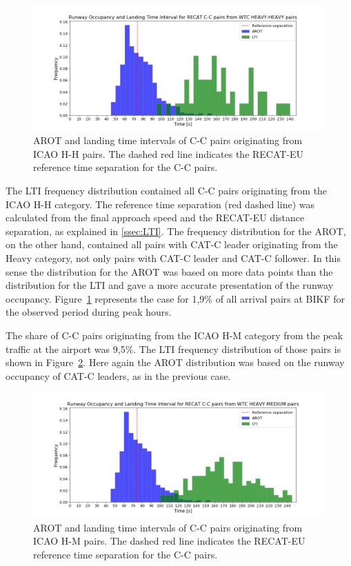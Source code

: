 \begin{figure}[h]
    \centering
    \includegraphics[width=1\textwidth]{graphics/fig_CC_from_HH_pairs_time_sep.png}
    \caption[AROT and LTI of C-C pairs originating from ICAO H-H pairs]{AROT and landing time intervals of C-C pairs originating from ICAO H-H pairs. The dashed red line indicates the RECAT-EU reference time separation for the C-C pairs.}
    \label{fig:CC_from_HH_pairs_time_sep}
\end{figure}

The LTI frequency distribution contained all C-C pairs originating from the ICAO H-H category. The reference time separation (red dashed line) was calculated from the final approach speed and the RECAT-EU distance separation, as explained in \ref{ssec:LTI}. The frequency distribution for the AROT, on the other hand, contained all pairs with CAT-C leader originating from the Heavy category, not only pairs with CAT-C leader and CAT-C follower. In this sense the distribution for the AROT was based on more data points than the distribution for the LTI and gave a more accurate presentation of the runway occupancy. Figure~\ref{fig:CC_from_HH_pairs_time_sep} represents the case for 1,9\% of all arrival pairs at BIKF for the observed period during peak hours.

The share of C-C pairs originating from the ICAO H-M category from the peak traffic at the airport was 9,5\%.  The LTI frequency distribution of those pairs is shown in Figure~\ref{fig:CC_from_HM_pairs_time_sep}. Here again the AROT distribution was based on the runway occupancy of CAT-C leaders, as in the previous case. 
 
\begin{figure}[h]
    \centering
    \includegraphics[width=1\textwidth]{graphics/fig_CC_from_HM_pairs_time_sep.png}
    \caption[AROT and LTI of C-C pairs originating from ICAO H-M pairs]{AROT and landing time intervals of C-C pairs originating from ICAO H-M pairs. The dashed red line indicates the RECAT-EU reference time separation for the C-C pairs.}
    \label{fig:CC_from_HM_pairs_time_sep}
\end{figure}

